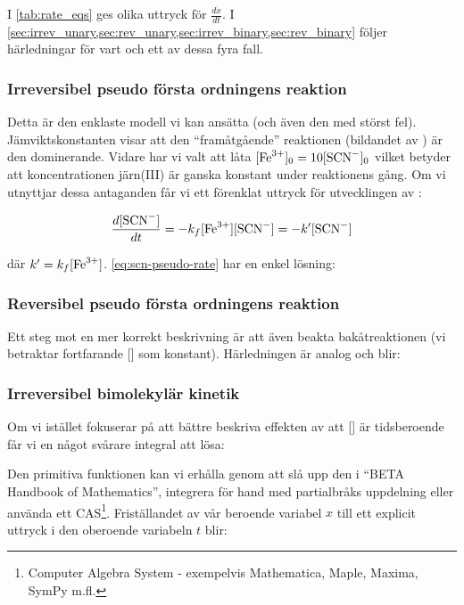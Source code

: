 I \cref{tab:rate_eqs} ges olika uttryck för $\frac{dx}{dt}$. I
\cref{sec:irrev_unary,sec:rev_unary,sec:irrev_binary,sec:rev_binary} 
följer härledningar för vart och ett av dessa fyra fall. 


\subsubsection{Irreversibel pseudo första ordningens reaktion}
\label{sec:irrev_unary}
Detta är den enklaste modell vi kan ansätta (och även den med störst fel).
Jämviktskonstanten visar att den ``framåtgående'' reaktionen (bildandet av )
är den dominerande. Vidare har vi valt att låta $[\ce{Fe^3+}]_0=10[\ce{SCN-}]_0$ vilket
betyder att koncentrationen järn(III) är ganska konstant under reaktionens gång. Om vi
utnyttjar dessa antaganden får vi ett förenklat uttryck för utvecklingen
av :

\begin{equation}
  \label{eq:scn-pseudo-rate}
  \frac{d[\ce{SCN-}]}{dt} = -k_f[\ce{Fe^3+}][\ce{SCN-}] = -k'[\ce{SCN-}]
\end{equation}

där $k' = k_f[\ce{Fe^3+}]$. \cref{eq:scn-pseudo-rate} har en enkel lösning:



\subsubsection{Reversibel pseudo första ordningens reaktion}
\label{sec:rev_unary}
Ett steg mot en mer korrekt beskrivning är att även beakta
bakåtreaktionen (vi betraktar fortfarande [] som
konstant). Härledningen är analog och blir:




\subsubsection{Irreversibel bimolekylär kinetik}
\label{sec:irrev_binary}
Om vi istället fokuserar på att bättre beskriva effekten av att
[] är tidsberoende får vi en något svårare integral att lösa:



Den primitiva funktionen kan vi erhålla genom att slå upp den i ``BETA Handbook of
Mathematics'', integrera för hand med partialbråks 
uppdelning eller använda ett CAS\footnote{  Computer Algebra System -
  exempelvis Mathematica, Maple, Maxima, SymPy m.fl.}. Friställandet av
vår beroende variabel $x$ till ett explicit uttryck i den oberoende
variabeln $t$ blir:  

